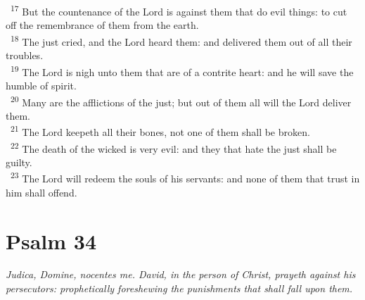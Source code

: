 \documentclass[a5paper,12pt]{article}
\begin{document}
\begin{multicols*}{2}
~\textsuperscript{17} But the countenance of the Lord is against them that do evil things: to cut off the remembrance of them from the earth.\\
~\textsuperscript{18} The just cried, and the Lord heard them: and delivered them out of all their troubles.\\
~\textsuperscript{19} The Lord is nigh unto them that are of a contrite heart: and he will save the humble of spirit.\\
~\textsuperscript{20} Many are the afflictions of the just; but out of them all will the Lord deliver them.\\
~\textsuperscript{21} The Lord keepeth all their bones, not one of them shall be broken.\\
~\textsuperscript{22} The death of the wicked is very evil: and they that hate the just shall be guilty.\\
~\textsuperscript{23} The Lord will redeem the souls of his servants: and none of them that trust in him shall offend.\\

\section{Psalm 34}
\label{sec:org93be269}
\emph{Judica, Domine, nocentes me. David, in the person of Christ, prayeth against his persecutors: prophetically foreshewing the punishments that shall fall upon them.}\\


\end{multicols*}
\end{document}
